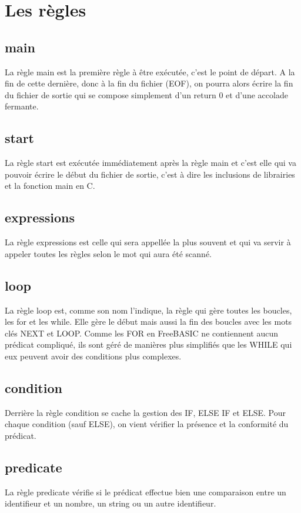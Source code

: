 \section{Les règles}

\subsection{main}
    La règle main est la première règle à être exécutée, c'est le point de départ. A la fin de cette dernière, donc à la fin du fichier (EOF), on pourra alors écrire la fin du fichier de sortie qui se compose simplement d'un return 0 et d'une accolade fermante.
    
\subsection{start}
    La règle start est exécutée immédiatement après la règle main et c'est elle qui va pouvoir écrire le début du fichier de sortie, c'est à dire les inclusions de librairies et la fonction main en C.
    
\subsection{expressions}
    La règle expressions est celle qui sera appellée la plus souvent et qui va servir à appeler toutes les règles selon le mot qui aura été scanné.
    
\subsection{loop}
    La règle loop est, comme son nom l'indique, la règle qui gère toutes les boucles, les for et les while. Elle gère le début mais aussi la fin des boucles avec les mots clés NEXT et LOOP. Comme les FOR en FreeBASIC ne contiennent aucun prédicat compliqué, ils sont géré de manières plus simplifiés que les WHILE qui eux peuvent avoir des conditions plus complexes.
    
\subsection{condition}
    Derrière la règle condition se cache la gestion des IF, ELSE IF et ELSE. Pour chaque condition (sauf ELSE), on vient vérifier la présence et la conformité du prédicat.

\subsection{predicate}
    La règle predicate vérifie si le prédicat effectue bien une comparaison entre un identifieur et un nombre, un string ou un autre identifieur.

